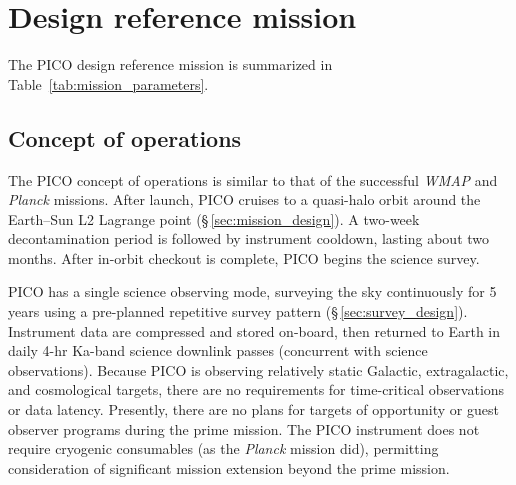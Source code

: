 \newpage
\section{Design reference mission}
\label{sec:design_reference} %
The PICO design reference mission is summarized in Table~\ref{tab:mission_parameters}.

\subsection{Concept of operations}
\label{sec:operations} %

The PICO concept of operations is similar to that of the successful
\textit{WMAP} \citep{Bennett2003} and \textit{Planck} \citep{Tauber2010} missions. After launch,
PICO cruises to a quasi-halo orbit around the Earth--Sun L2 Lagrange point
(\S\,\ref{sec:mission_design}). A two-week decontamination period is followed by
instrument cooldown, lasting about two months. After in-orbit checkout is complete, PICO begins
the science survey.

PICO has a single science observing mode, surveying the sky
continuously for 5 years using a pre-planned repetitive survey pattern
(\S\,\ref{sec:survey_design}). Instrument data are compressed and stored on-board, then
returned to Earth in daily 4-hr Ka-band science downlink passes
(concurrent with science observations). Because PICO is observing
relatively static Galactic, extragalactic, and cosmological targets,
there are no requirements for time-critical observations or data
latency. Presently, there are no plans for targets of opportunity or
guest observer programs during the prime mission. The PICO instrument
does not require cryogenic consumables (as the \textit{Planck} mission did),
permitting consideration of significant mission extension beyond the prime
mission.


